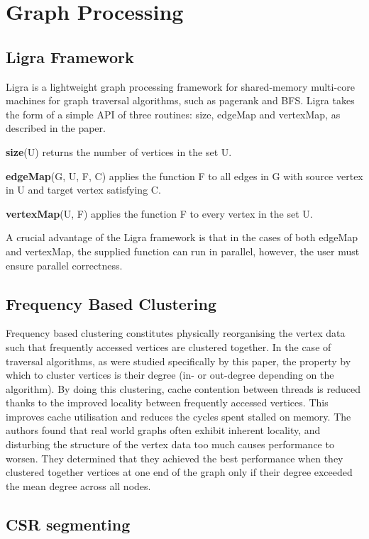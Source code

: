 \section{Graph Processing}

\subsection{Ligra Framework}

Ligra is a lightweight graph processing framework for shared-memory multi-core machines for graph traversal algorithms, such as pagerank and BFS. Ligra takes the form of a simple API of three routines: size, edgeMap and vertexMap, as described in the paper.

\textbf{size}(U) returns the number of vertices in the set U.

\textbf{edgeMap}(G, U, F, C) applies the function F to all edges in G with source vertex in U and target vertex satisfying C.

\textbf{vertexMap}(U, F) applies the function F to every vertex in the set U.

A crucial advantage of the Ligra framework is that in the cases of both edgeMap and vertexMap, the supplied function can run in parallel, however, the user must ensure parallel correctness.

\subsection{Frequency Based Clustering}

Frequency based clustering constitutes physically reorganising the vertex data such that frequently accessed vertices are clustered together. In the case of traversal algorithms, as were studied specifically by this paper, the property by which to cluster vertices is their degree (in- or out-degree depending on the algorithm). By doing this clustering, cache contention between threads is reduced thanks to the improved locality between frequently accessed vertices. This improves cache utilisation and reduces the cycles spent stalled on memory. The authors found that real world graphs often exhibit inherent locality, and disturbing the structure of the vertex data too much causes performance to worsen. They determined that they achieved the best performance when they clustered together vertices at one end of the graph only if their degree exceeded the mean degree across all nodes.

\subsection{CSR segmenting}

